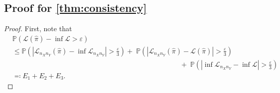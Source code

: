 \documentclass{article}
\begin{document}
\subsection{Proof for \cref{thm:consistency}}\label{pf:thm:consistency}
\begin{proof}
	First, note that
	\begin{align*}
		&\mathbb{P}\left(\mathcal{L}(\hat{\pi}) - \inf \mathcal{L} > \varepsilon\right) \\[2pt]
		&\leq \mathbb{P}\left(\left\vert \mathcal{L}_{n_Xn_Y}(\hat{\pi}) - \inf \mathcal{L}_{n_Xn_Y} \right\vert > \frac{\varepsilon}{3}\right) +\;   \mathbb{P}\left(\left\vert \mathcal{L}_{n_Xn_Y}(\hat{\pi}) - \mathcal{L}(\hat{\pi}) \right\vert > \frac{\varepsilon}{3}\right) \\
		&\quad\quad\quad\quad\quad\quad\quad\quad\quad\quad\quad\quad\quad\quad\quad\quad\quad\quad\quad\quad\quad\quad\quad\quad +\; \mathbb{P}\left(\left\vert \inf \mathcal{L}_{n_Xn_Y} - \inf \mathcal{L} \right\vert > \frac{\varepsilon}{3}\right) \\
		&\eqqcolon E_1 + E_2 + E_3 .
	\end{align*}
	

\end{proof}
\end{document}
